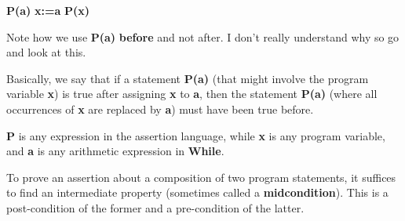 \documentclass[11pt,a4paper,titlepage,dvipsnames,cmyk]{scrartcl}
\begin{document}
\begin{center}
    {\color{blue}\textbf{P(a)}} {\color{green}\textbf{x:=a}}
    {\color{blue}\textbf{P(x)}}
\end{center}

Note how we use {\color{blue}\textbf{P(a)}} \textbf{before} and not after.
I don't really understand why so go and look at this.

Basically, we say that if a statement {\color{blue}\textbf{P(a)}} (that
might involve the program variable \textbf{x}) is true after assigning
\textbf{x} to \textbf{a}, then the statement {\color{blue}\textbf{P(a)}}
(where all occurrences of \textbf{x} are replaced by \textbf{a}) must have
been true before.

\textbf{P} is any expression in the assertion language, while \textbf{x}
is any program variable, and \textbf{a} is any arithmetic expression in
\textbf{While}.

To prove an assertion about a composition of two program statements, it
suffices to find an intermediate property (sometimes called a
\textbf{midcondition}). This is a post-condition of the former and a
pre-condition of the latter.

\end{document}
